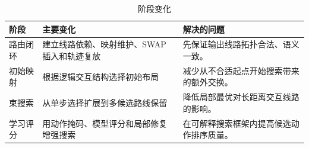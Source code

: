 \begin{table}[H]
  \centering
  \caption{阶段变化}
  \label{tab:method-phases}
  \begin{tabularx}{\linewidth}{lYY}
    \toprule
    阶段 & 主要变化 & 解决的问题 \\
    \midrule
    路由闭环 & 建立线路依赖、映射维护、SWAP 插入和轨迹复放 & 先保证输出线路拓扑合法、语义一致。\\
    初始映射 & 根据逻辑交互结构选择初始布局 & 减少从不合适起点开始搜索带来的额外交换。\\
    束搜索 & 从单步选择扩展到多候选路线保留 & 降低局部最优对长距离交互线路的影响。\\
    学习评分 & 用动作掩码、模型评分和局部修复增强搜索 & 在可解释搜索框架内提高候选动作排序质量。\\
    \bottomrule
  \end{tabularx}
\end{table}
